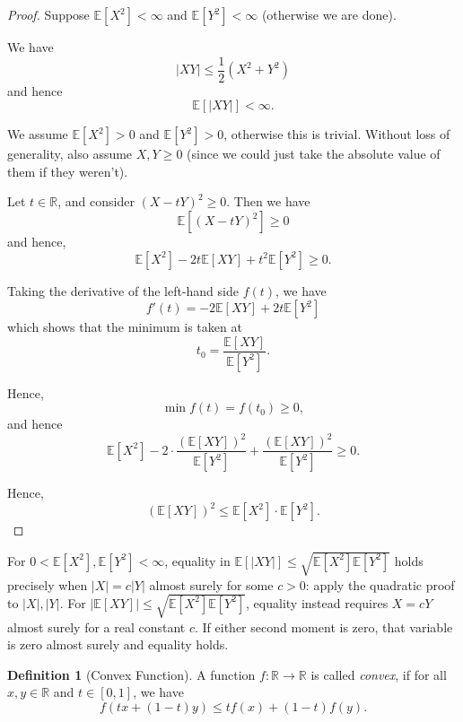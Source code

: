\documentclass[11pt]{article}
\numberwithin{equation}{section}
\theoremstyle{definition}
\newtheorem{definition}[theorem]{Definition}
\theoremstyle{remark}
\newcommand{\pqty}[1]{\left(#1\right)}
\newcommand{\bqty}[1]{\left[#1\right]}
\newcommand{\abs}[1]{\left|#1\right|}
\newcommand{\ccintv}[2]{[#1,#2]}
\newcommand{\functiondomain}[3]{#1:#2\to #3}
\newcommand{\RR}{\mathbb R}
\newcommand{\Expt}{\mathbb E}
\begin{document}
\begin{proof}\label{probability-proof-029}
    Suppose \(\Expt\bqty{X^2} < \infty\) and \(\Expt\bqty{Y^2} < \infty\) (otherwise we are done).

    We have
    \[
        \abs{XY} \leq \frac{1}{2} \pqty{X^2 + Y^2}
    \]
    and hence
    \[
        \Expt\bqty{\abs{XY}} < \infty.
    \]

    We assume \(\Expt\bqty{X^2} > 0\) and \(\Expt\bqty{Y^2} > 0\), otherwise this is trivial. Without loss of generality, also assume \(X, Y \geq 0\) (since we could just take the absolute value of them if they weren't).

    Let \(t \in \RR\), and consider \(\pqty{X - tY}^2 \geq 0\). Then we have
    \[
        \Expt\bqty{\pqty{X - tY}^2} \geq 0
    \]
    and hence,
    \[
        \Expt\bqty{X^2} - 2t \Expt\bqty{XY} + t^2 \Expt\bqty{Y^2} \geq 0.
    \]

    Taking the derivative of the left-hand side \(f\pqty{t}\), we have
    \[
        f'\pqty{t} = -2 \Expt\bqty{XY} + 2t \Expt\bqty{Y^2}
    \]
    which shows that the minimum is taken at
    \[
        t_0 = \frac{\Expt\bqty{XY}}{\Expt\bqty{Y^2}}.
    \]

    Hence,
    \[
        \min f\pqty{t} = f\pqty{t_0} \geq 0,
    \]
    and hence
    \[
        \Expt\bqty{X^2} - 2 \cdot \frac{\pqty{\Expt\bqty{XY}}^2}{\Expt\bqty{Y^2}} + \frac{\pqty{\Expt\bqty{XY}}^2}{\Expt\bqty{Y^2}} \geq 0.
    \]

    Hence,
    \[
        \pqty{\Expt\bqty{XY}}^2 \leq \Expt\bqty{X^2} \cdot \Expt\bqty{Y^2}.
    \]
\end{proof}

For \(0<\Expt[X^2],\Expt[Y^2]<\infty\), equality in
\(\Expt[|XY|]\le\sqrt{\Expt[X^2]\Expt[Y^2]}\) holds precisely when
\(|X|=c|Y|\) almost surely for some \(c>0\): apply the quadratic proof to
\(|X|,|Y|\). For \(|\Expt[XY]|\le\sqrt{\Expt[X^2]\Expt[Y^2]}\), equality
instead requires \(X=cY\) almost surely for a real constant \(c\).
If either second moment is zero, that variable is zero almost surely and equality holds.

\begin{definition}[Convex Function]\label{probability-definition-030}
    \label{probability-def:convex-fn}%
    A function \(\functiondomain{f}{\RR}{\RR}\) is called \emph{convex}, if for all \(x, y \in \RR\) and \(t \in \ccintv{0}{1}\), we have
    \[
        f\pqty{tx + \pqty{1 - t} y} \leq t f\pqty{x} + \pqty{1 - t} f\pqty{y}.
    \]
\end{definition}
\end{document}
